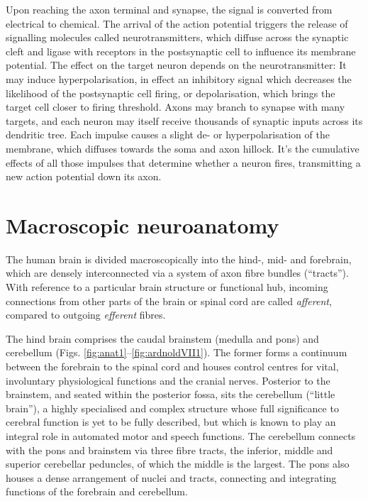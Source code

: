 \documentclass[12pt,phd,a4paper,twoside]{ucl_thesis}
\begin{document}
Upon reaching the axon terminal and synapse, the signal is converted from electrical to chemical.
The arrival of the action potential triggers the release of signalling molecules called neurotransmitters, which diffuse across the synaptic cleft and ligase with receptors in the postsynaptic cell to influence its membrane potential.
The effect on the target neuron depends on the neurotransmitter:
It may induce hyperpolarisation, in effect an inhibitory signal which decreases the likelihood of the postsynaptic cell firing, or depolarisation, which brings the target cell closer to firing threshold.
Axons may branch to synapse with many targets, and each neuron may itself receive thousands of synaptic inputs across its dendritic tree.
Each impulse causes a slight de- or hyperpolarisation of the membrane, which diffuses towards the soma and axon hillock.
It's the cumulative effects of all those impulses that determine whether a neuron fires, transmitting a new action potential down its axon.

\section{Macroscopic neuroanatomy}

The human brain is divided macroscopically into the hind-, mid- and forebrain, which are densely interconnected via a system of axon fibre bundles (``tracts'').
With reference to a particular brain structure or functional hub, incoming connections from other parts of the brain or spinal cord are called \textit{afferent}, compared to outgoing \textit{efferent} fibres.

The hind brain comprises the caudal brainstem (medulla and pons) and cerebellum (Figs. \ref{fig:anat1}--\ref{fig:ardnoldVII1}).
The former forms a continuum between the forebrain to the spinal cord and houses control centres for vital, involuntary physiological functions and the cranial nerves.
Posterior to the brainstem, and seated within the posterior fossa, sits the cerebellum (``little brain''),
a highly specialised and complex structure whose full significance to cerebral function is yet to be fully described, but which is known to play an integral role in automated motor and speech functions.
The cerebellum connects with the pons and brainstem via three fibre tracts, the inferior, middle and superior cerebellar peduncles, of which the middle is the largest.
The pons also houses a dense arrangement of nuclei and tracts, connecting and integrating functions of the forebrain and cerebellum.
\end{document}
